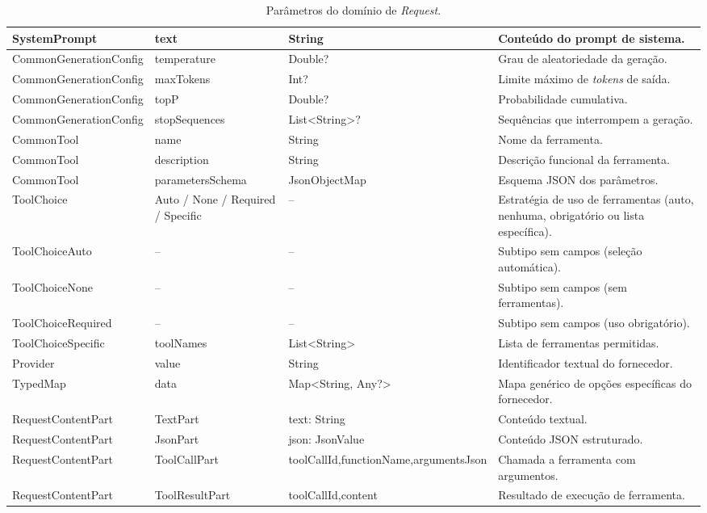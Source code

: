 \begin{table}[H]
\begin{tabularx}{\textwidth}{|>{\raggedright\arraybackslash}p{2.9cm}|>{\raggedright\arraybackslash}p{2.6cm}|>{\raggedright\arraybackslash}p{2.6cm}|>{\raggedright\arraybackslash}X|}
    SystemPrompt & text & String & Conteúdo do prompt de sistema. \\ \hline

    Common\-GenerationConfig & temperature & Double? & Grau de aleatoriedade da geração. \\ \hline
    Common\-GenerationConfig & maxTokens & Int? & Limite máximo de \textit{tokens} de saída. \\ \hline
    Common\-GenerationConfig & topP & Double? & Probabilidade cumulativa. \\ \hline
    Common\-GenerationConfig & stopSequences & List<String>? & Sequências que interrompem a geração. \\ \hline

    CommonTool & name & String & Nome da ferramenta. \\ \hline
    CommonTool & description & String & Descrição funcional da ferramenta. \\ \hline
    CommonTool & parametersSchema & JsonObjectMap & Esquema JSON dos parâmetros. \\ \hline

    ToolChoice & Auto / None / Required / Specific & -- & Estratégia de uso de ferramentas (auto, nenhuma, obrigatório ou lista específica). \\ \hline
    ToolChoiceAuto & -- & -- & Subtipo sem campos (seleção automática). \\ \hline
    ToolChoiceNone & -- & -- & Subtipo sem campos (sem ferramentas). \\ \hline
    ToolChoiceRequired & -- & -- & Subtipo sem campos (uso obrigatório). \\ \hline
    ToolChoiceSpecific & toolNames & List<String> & Lista de ferramentas permitidas. \\ \hline

    Provider & value & String & Identificador textual do fornecedor. \\ \hline
    TypedMap & data & Map<String, Any?> & Mapa genérico de opções específicas do fornecedor. \\ \hline

    RequestContentPart & TextPart & text: String & Conteúdo textual. \\ \hline
    RequestContentPart & JsonPart & json: JsonValue & Conteúdo JSON estruturado. \\ \hline
    RequestContentPart & ToolCallPart & toolCallId,\newline functionName,\newline argumentsJson & Chamada a ferramenta com argumentos. \\ \hline
    RequestContentPart & ToolResultPart & toolCallId,\newline content & Resultado de execução de ferramenta. \\ \hline

    \end{tabularx}
    \caption{Parâmetros do domínio de \textit{Request}.}
    \label{tab:request-parametros}
\end{table}


